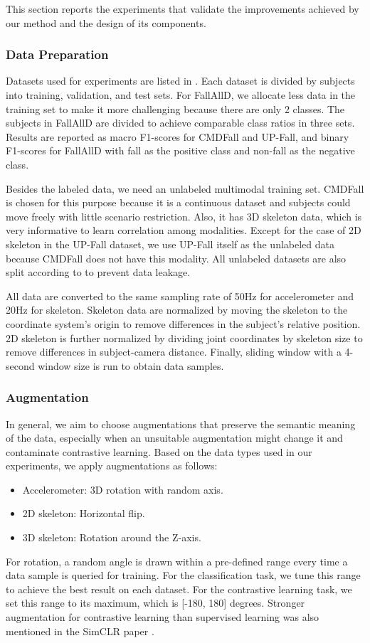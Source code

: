 \documentclass[conference]{IEEEtran}
\begin{document}
This section reports the experiments that validate the improvements achieved by our method and the design of its components.

\subsubsection{Data Preparation}
Datasets used for experiments are listed in . Each dataset is divided by subjects into training, validation, and test sets. For FallAllD, we allocate less data in the training set to make it more challenging because there are only 2 classes. The subjects in FallAllD are divided to achieve comparable class ratios in three sets. Results are reported as macro F1-scores for CMDFall and UP-Fall, and binary F1-scores for FallAllD with fall as the positive class and non-fall as the negative class.

Besides the labeled data, we need an unlabeled multimodal training set. CMDFall is chosen for this purpose because it is a continuous dataset and subjects could move freely with little scenario restriction. Also, it has 3D skeleton data, which is very informative to learn correlation among modalities. Except for the case of 2D skeleton in the UP-Fall dataset, we use UP-Fall itself as the unlabeled data because CMDFall does not have this modality. All unlabeled datasets are also split according to  to prevent data leakage.

All data are converted to the same sampling rate of 50Hz for accelerometer and 20Hz for skeleton. Skeleton data are normalized by moving the skeleton to the coordinate system's origin to remove differences in the subject's relative position. 2D skeleton is further normalized by dividing joint coordinates by skeleton size to remove differences in subject-camera distance. Finally, sliding window with a 4-second window size is run to obtain data samples.

\subsubsection{Augmentation}
In general, we aim to choose augmentations that preserve the semantic meaning of the data, especially when an unsuitable augmentation might change it and contaminate contrastive learning. Based on the data types used in our experiments, we apply augmentations as follows:
\begin{itemize}
    \item Accelerometer: 3D rotation with random axis.
    \item 2D skeleton: Horizontal flip.
    \item 3D skeleton: Rotation around the Z-axis.
\end{itemize}
For rotation, a random angle is drawn within a pre-defined range every time a data sample is queried for training. For the classification task, we tune this range to achieve the best result on each dataset. For the contrastive learning task, we set this range to its maximum, which is [-180, 180] degrees. Stronger augmentation for contrastive learning than supervised learning was also mentioned in the SimCLR paper \cite{Chen2020}.
\end{document}
